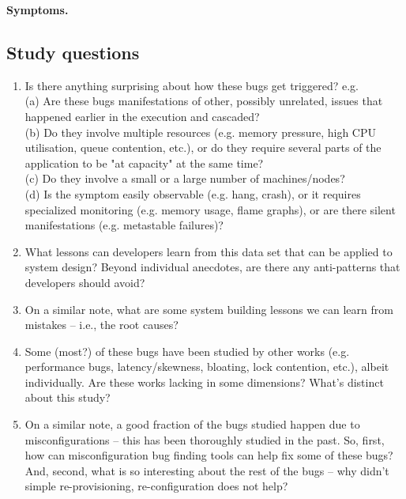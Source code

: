 \vspace{.05in}
\noindent
\textbf{Symptoms.}


\subsection{Study questions}

\begin{enumerate}
    \item Is there anything surprising about how these bugs get triggered? e.g. 
    \\ (a) Are these bugs manifestations of other, possibly unrelated, issues that 
    happened earlier in the execution and cascaded? 
    \\ (b) Do they involve multiple resources (e.g. memory pressure, high CPU utilisation, queue contention, etc.), 
    or do they require several parts of the application to be "at capacity" at the same time? 
    \\ (c) Do they involve a small or a large number of machines/nodes? 
    \\ (d) Is the symptom easily observable (e.g. hang, crash), or it requires specialized monitoring 
    (e.g. memory usage, flame graphs), or are there silent manifestations (e.g. metastable failures)?  
    \item What lessons can developers learn from this data set that can be applied to system design? Beyond 
    individual anecdotes, are there any anti-patterns that developers should avoid?
    \item On a similar note, what are some system building lessons we can learn from mistakes -- i.e., the root causes?
    \item Some (most?) of these bugs have been studied by other works (e.g. performance bugs, latency/skewness, 
    bloating, lock contention, etc.), albeit individually. Are these works lacking in some dimensions? What's 
    distinct about this study?
    \item On a similar note, a good fraction of the bugs studied happen due to misconfigurations -- this has been 
    thoroughly studied in the past. So, first, how can misconfiguration bug finding tools can help fix some 
    of these bugs? And, second, what is so interesting about the rest of the bugs -- why didn't simple re-provisioning, 
    re-configuration does not help?
\end{enumerate}
